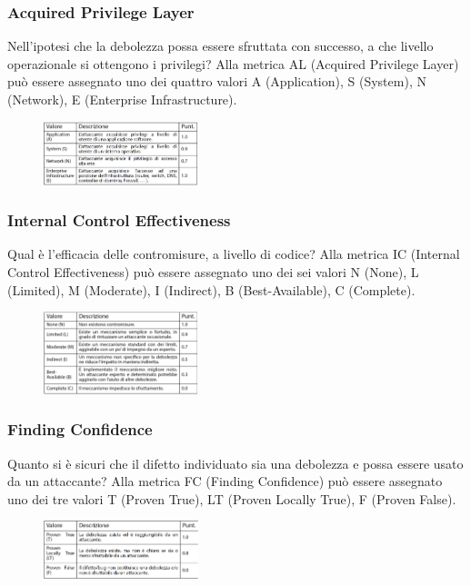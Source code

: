 \subsubsection{Acquired Privilege Layer}
Nell’ipotesi che la debolezza possa essere sfruttata
con successo, a che livello operazionale
si ottengono i privilegi? Alla metrica AL (Acquired Privilege Layer) può essere
assegnato uno dei quattro valori
A (Application), S (System),
N (Network), E (Enterprise Infrastructure).

\begin{figure}[hbpt!]
    \centering
    \includegraphics[width=0.4\textwidth]{./Images/cap3/3.6.png}
\end{figure}
\FloatBarrier

\subsubsection{Internal Control Effectiveness}
Qual è l’efficacia delle contromisure, a livello di codice? Alla metrica IC (Internal Control Effectiveness) può essere
assegnato uno dei sei valori
N (None), L (Limited), M (Moderate),
I (Indirect), B (Best-Available), C (Complete).

\begin{figure}[hbpt!]
    \centering
    \includegraphics[width=0.4\textwidth]{./Images/cap3/3.7.png}
\end{figure}
\FloatBarrier

\subsubsection{Finding Confidence}
Quanto si è sicuri che il difetto individuato sia una
debolezza e possa essere usato da un attaccante? Alla metrica FC (Finding Confidence) può essere
assegnato uno dei tre valori
T (Proven True), LT (Proven Locally True), F (Proven False).

\begin{figure}[hbpt!]
    \centering
    \includegraphics[width=0.4\textwidth]{./Images/cap3/3.8.png}
\end{figure}
\FloatBarrier

